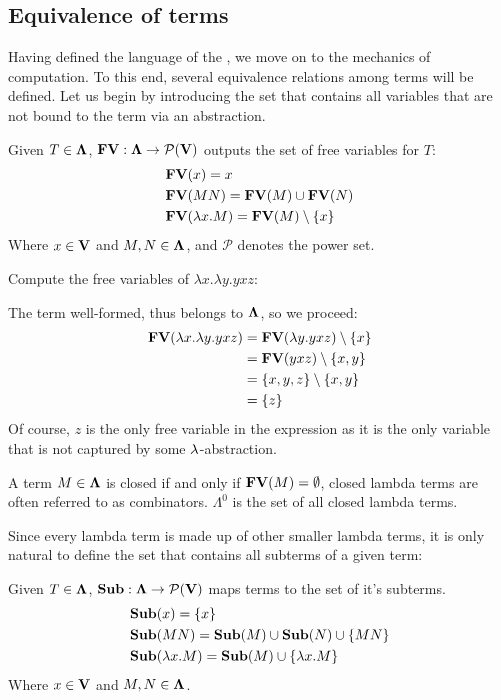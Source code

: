 \documentclass[12pt]{book}
\begin{document}
\subsection{\centering Equivalence of terms}
Having defined the language of the \lcalc, we move on to the mechanics of computation. To this end, several equivalence relations among terms will be defined. Let us begin by introducing the set that contains all variables that are not bound to the term via an abstraction.
\begin{definition} Given $T \in \mathbf{\Lambda} $, $\mathbf{FV} : \mathbf{\Lambda} \to \mathcal{P}(\mathbf{V}) $ outputs the set of free variables for $T$:
  \begin{align*}
    & \mathbf{FV}(x) = {x}\\
    & \mathbf{FV}(MN) = \mathbf{FV}(M) \cup \mathbf{FV}(N) \\
    & \mathbf{FV}(\lambda x . M) = \mathbf{FV}(M) \setminus \{x\}
  \end{align*}
  Where $ x \in \mathbf{V} $ and $ M, N \in \mathbf{\Lambda} $, and $\mathcal{P}$ denotes the power set.
\end{definition}
\begin{example}
  Compute the free variables of $\lambda x . \lambda y . y x z$:
  
  The term well-formed, thus belongs to $\mathbf{\Lambda}$, so we proceed:
  \begin{align*}
    \mathbf{FV}(\lambda x . \lambda y . y x z) &= \mathbf{FV}(\lambda y . yxz) \setminus \{x\} \\
                                        &= \mathbf{FV}(yxz) \setminus \{x, y\} \\
                                        &= \{x, y, z\} \setminus \{x, y\} \\
                                        &= \{z\}
  \end{align*}
  Of course, $z$ is the only free variable in the expression as it is the only variable that is not captured by some $\lambda$-abstraction.
\end{example}
\begin{definition}
  A term $M \in \mathbf{\Lambda}$ is closed if and only if $\mathbf{FV}(M) = \emptyset$, closed lambda terms are often referred to as combinators. $\Lambda^0$ is the set of all closed lambda terms.
\end{definition}
Since every lambda term is made up of other smaller lambda terms, it is only natural to define the set that contains all subterms of a given term:
\begin{definition} Given $T \in \mathbf{\Lambda}$, $\mathbf{Sub} : \mathbf{\Lambda} \to \mathcal{P}(\mathbf{V})$ maps terms to the set of it's subterms.
  \begin{align*}
    &\mathbf{Sub}(x) = \{x\} \\
    &\mathbf{Sub}(MN) = \mathbf{Sub}(M)  \cup \mathbf{Sub}(N) \cup \{MN\} \\
    &\mathbf{Sub}(\lambda x . M) = \mathbf{Sub}(M)  \cup \{\lambda x. M\}
  \end{align*}
  Where $x \in \mathbf{V}$ and $M, N \in \mathbf{\Lambda} $.
\end{definition}
\end{document}
